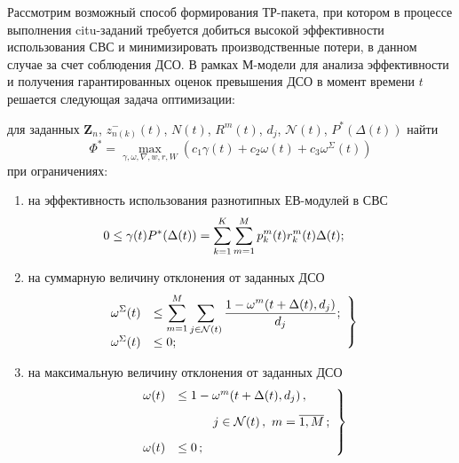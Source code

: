 \begin{multicols}{2}
Рассмотрим возможный способ формирования ТР-пакета, при котором в процессе выполнения citu-за\-да\-ний 
требуется добиться высокой эффективности использования СВС и минимизировать производственные потери, в 
данном случае за счет соблюдения ДСО.   В рамках М-модели для анализа эффективности и получения гарантированных 
оценок превышения ДСО в момент времени $t$ решается следующая задача оптимизации:

\smallskip

\noindent
для заданных $\mathbf{Z}_n$, $z^-_{n(k)}(t)$, $N(t)$,  $R^m(t)$, $d_j$, $\mathcal{N}(t)$, $P^*(\Delta(t))$ найти
\begin{equation}
\Phi^* = \max\limits_{\gamma, \omega, \nabla, w, r, W} (c_1\gamma(t) + c_2 \omega (t) + c_3 \omega ^{\Sigma} (t)) 
\label{e14-mal}
\end{equation}
при ограничениях:
\begin{enumerate}[(1)]
\item на эффективность использования  разнотипных ЕВ-модулей  в СВС
\begin{equation}
\hspace*{-10mm}0 \le \gamma (t) P^*(\Delta(t))  =  \sum\limits_{k = 1}^K \sum\limits_{m = 1}^M p^m_k(t)  r_k^m(t)  \Delta(t);
\label{e15-mal}
\end{equation}

\item на суммарную величину отклонения от заданных ДСО
\begin{equation}
\left.  
\begin{array}{rl}
\hspace*{-6mm}\displaystyle\omega^{\Sigma} (t ) &\displaystyle\le \sum\limits_{m = 1}^{M} \sum\limits_{j \in \mathcal{N}(t)} 
\fr{1-\omega^m(t+\Delta(t),d_j)}{d_j};\\[9pt] 
\hspace*{-6mm}\omega^{\Sigma} (t )& \le 0;
                    \end{array}
                    \right \}
                    \label{e16-mal}
                    \end{equation}

\item на максимальную величину отклонения от заданных ДСО
\begin{equation}
 \left.  \begin{array}{rl}
\omega (t) &\le 1 -  \omega^m(t + \Delta(t), d_j)\,,\\[9pt]
& \hspace*{10mm}j\in \mathcal{N}(t)\,, \ m = \overline{1,M}\,;\\[9pt]
\omega (t) &\le 0\,;
                    \end{array}
                    \right \} 
                    \label{e17-mal}
                    \end{equation}


\end{enumerate}
\end{multicols}
